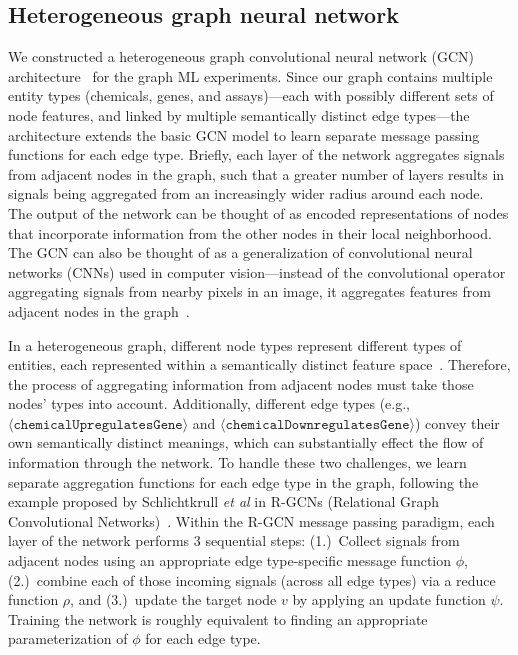 \documentclass{ws-procs11x85}
\begin{document}
\subsection{Heterogeneous graph neural network}
We constructed a heterogeneous graph convolutional neural network (GCN) architecture~\cite{kipf2016semi} for the graph ML experiments.
Since our graph contains multiple entity types (chemicals, genes, and assays)---each with possibly different sets of node features, and linked by multiple semantically distinct edge types---the architecture extends the basic GCN model to learn separate message passing functions for each edge type.
Briefly, each layer of the network aggregates signals from adjacent nodes in the graph, such that a greater number of layers results in signals being aggregated from an increasingly wider radius around each node.
The output of the network can be thought of as encoded representations of nodes that incorporate information from the other nodes in their local neighborhood.
The GCN can also be thought of as a generalization of convolutional neural networks (CNNs) used in computer vision---instead of the convolutional operator aggregating signals from nearby pixels in an image, it aggregates features from adjacent nodes in the graph~\cite{chen2019multi}.

In a heterogeneous graph, different node types represent different types of entities, each represented within a semantically distinct feature space~\cite{zhang2019heterogeneous}.
Therefore, the process of aggregating information from adjacent nodes must take those nodes' types into account.
Additionally, different edge types (e.g., $\langle \mathtt{chemicalUpregulatesGene}\rangle$ and $\langle \mathtt{chemicalDownregulatesGene}\rangle$) convey their own semantically distinct meanings, which can substantially effect the flow of information through the network.
To handle these two challenges, we learn separate aggregation functions for each edge type in the graph, following the example proposed by Schlichtkrull \textit{et al} in R-GCNs (Relational Graph Convolutional Networks)~\cite{schlichtkrull2018modeling}.
Within the R-GCN message passing paradigm, each layer of the network performs 3 sequential steps: (1.)~Collect signals from adjacent nodes using an appropriate edge type-specific message function $\phi$, (2.)~combine each of those incoming signals (across all edge types) via a reduce function $\rho$, and (3.)~update the target node $v$ by applying an update function $\psi$.
Training the network is roughly equivalent to finding an appropriate parameterization of $\phi$ for each edge type.
\end{document}
